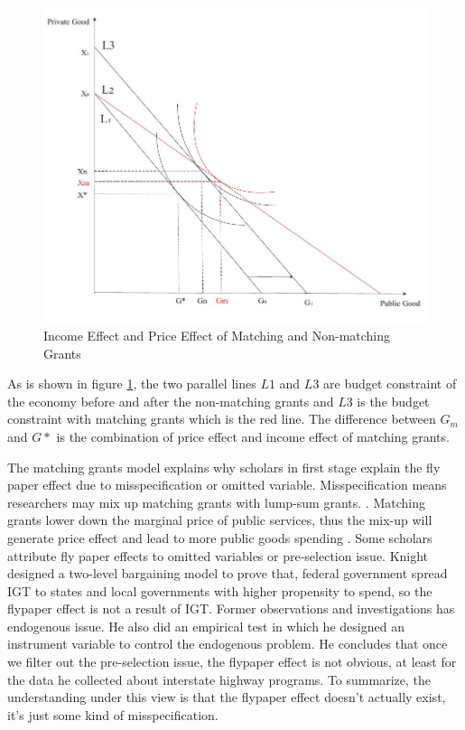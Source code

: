 \begin{figure}[H]
    \centering
    \includegraphics[scale=0.4]{Chapter-3/Figures/mfyeffect.jpg}
    \caption[Income Effect and Price Effect of Matching and Non-matching Grants]{Income Effect and Price Effect of Matching and Non-matching Grants
        \texttt{} }
    \label{Figure 3.3}
\end{figure}

As is shown in figure \ref{Figure 3.3}, the two parallel lines $L1$ and $L3$ are budget constraint of the economy before and after the non-matching grants and $L3$ is the budget constraint with matching grants which is the red line. The difference between $G_m$ and $G*$ is the combination of price effect and income effect of matching grants.

The matching grants model explains why scholars in first stage explain the fly paper effect due to misspecification or omitted variable. Misspecification means researchers may mix up matching grants with lump-sum grants. \cite{lankford1987note,henderson1968local}. Matching grants lower down the marginal price of public services, thus the mix-up will generate price effect and lead to more public goods spending \cite{gramlich1997state}. Some scholars attribute fly paper effects to omitted variables or pre-selection issue. Knight \cite{knight2002endogenous} designed a two-level bargaining model to prove that, federal government spread IGT to states and local governments with higher propensity to spend, so the flypaper effect is not a result of IGT. Former observations and investigations has endogenous issue. He also did an empirical test in which he designed an instrument variable to control the endogenous problem. He concludes that once we filter out the pre-selection issue, the flypaper effect is not obvious, at least for the data he collected about interstate highway programs. To summarize, the understanding under this view is that the flypaper effect doesn’t actually exist, it's just some kind of misspecification.

